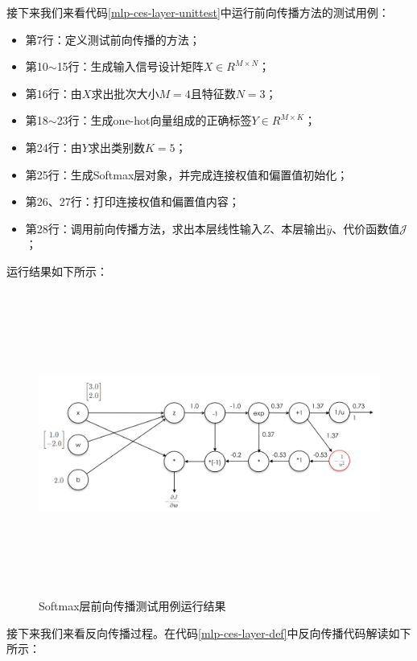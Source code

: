 \documentclass[UTF8]{article}
\begin{document}
接下来我们来看代码\ref{mlp-ces-layer-unittest}中运行前向传播方法的测试用例：
\begin{itemize}
\item 第7行：定义测试前向传播的方法；
\item 第10$\sim$15行：生成输入信号设计矩阵$X \in R^{M \times N}$；
\item 第16行：由$X$求出批次大小$M=4$且特征数$N=3$；
\item 第18$\sim$23行：生成one-hot向量组成的正确标签$Y \in R^{M \times K}$；
\item 第24行：由$Y$求出类别数$K=5$；
\item 第25行：生成Softmax层对象，并完成连接权值和偏置值初始化；
\item 第26、27行：打印连接权值和偏置值内容；
\item 第28行：调用前向传播方法，求出本层线性输入$Z$、本层输出$\hat{y}$、代价函数值$\mathcal{J}$；
\end{itemize}
运行结果如下所示：
\begin{figure}[H]
	\caption{Softmax层前向传播测试用例运行结果}
	\label{f000057001}
	\centering
	\includegraphics[height=10cm]{images/f000057}
\end{figure}
接下来我们来看反向传播过程。在代码\ref{mlp-ces-layer-def}中反向传播代码解读如下所示：
\end{document}
